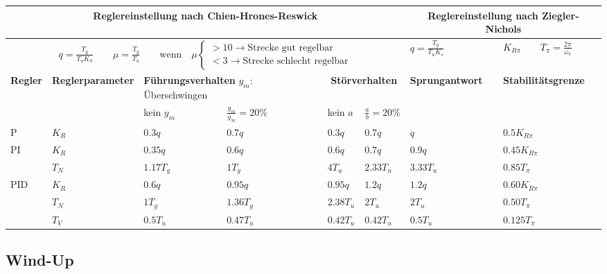 	\begin{tabular}{|l|p{1.8cm}|l|l|l|l||l|l|}
	    \hline
	    \multicolumn{6}{|c||}{
	      \textbf{Reglereinstellung nach Chien-Hrones-Reswick}
	    } &
	    \multicolumn{2}{|c|}{
	      \textbf{Reglereinstellung nach Ziegler-Nichols}
	    }
		\\ \hline
		\multicolumn{6}{|c||}{
		  $
		  q = \frac{T_g}{T_uK_S} \qquad \mu = \frac{T_g}{T_u}
		  \qquad \text{wenn} \quad \mu
		  \begin{cases}
		    > 10 \rightarrow \text{Strecke gut regelbar} \\
		    < 3 \rightarrow \text{Strecke schlecht regelbar}
		  \end{cases}
		  $
		} & $q=\frac{T_g}{T_uK_s}$ & $K_{R\pi} \qquad T_\pi=\frac{2\pi}{\omega_\pi}$
		\\ \hline
		\textbf{Regler} & \textbf{Regler\-parameter} &
		\multicolumn{2}{|p{3.5cm}|}{\textbf{Führungsverhalten} \newline $y_m$:
		Überschwingen} &
		\multicolumn{2}{|c||}{\textbf{Störverhalten}} &
		\textbf{Sprungantwort} & \textbf{Stabilitätsgrenze}
		\\ \hline
		& & kein $y_m$ & $\frac{y_m}{y_\infty} = 20 \%$ & kein $a$ & $\frac{a}{b}= 20 \%$ & &
		\\ \hline
		P 	& $K_R$ 	& $0.3q$ 	& $0.7q$ 	& $0.3q$ 	& $0.7q$	& $q$ 	& $0.5K_{R\pi}$
		\\ \hline
		PI	& $K_R$		& $0.35q$	& $0.6q$	& $0.6q$	& $0.7q$	& $0.9q$ 	& $0.45K_{R\pi}$
		\\
		    & $T_N$		& $1.17T_g$	& $1T_g$	& $4T_u$	& $2.33T_u$ & $3.33T_u$ &
		    $0.85T_{\pi}$ \\ \hline
		PID & $K_R$		& $0.6q$	& $0.95q$	& $0.95q$	& $1.2q$ 	& $1.2q$ 	& $0.60K_{R\pi}$
		\\
			& $T_N$		& $1T_g$	& $1.36T_g$	& $2.38T_u$	& $2T_u$ 	& $2T_u$	& $0.50T_\pi$
		\\
			& $T_V$		& $0.5T_u$	& $0.47T_u$	& $0.42T_u$	& $0.42T_u$ & $0.5T_u$ 	& $0.125T_\pi$
		\\ \hline
	\end{tabular}


	\subsection{Wind-Up }

